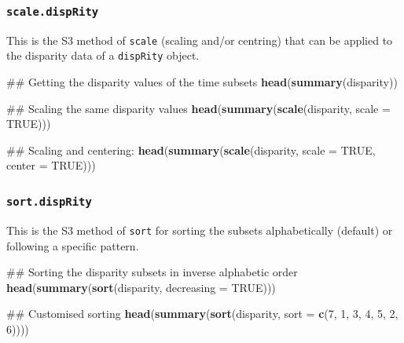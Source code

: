 \documentclass[]{book}
\newenvironment{Shaded}{\begin{snugshade}}{\end{snugshade}}
\newcommand{\KeywordTok}[1]{\textcolor[rgb]{0.13,0.29,0.53}{\textbf{#1}}}
\newcommand{\DataTypeTok}[1]{\textcolor[rgb]{0.13,0.29,0.53}{#1}}
\newcommand{\DecValTok}[1]{\textcolor[rgb]{0.00,0.00,0.81}{#1}}
\newcommand{\OtherTok}[1]{\textcolor[rgb]{0.56,0.35,0.01}{#1}}
\newcommand{\NormalTok}[1]{#1}
\theoremstyle{definition}
\theoremstyle{definition}
\theoremstyle{remark}
\begin{document}
\subsubsection{\texorpdfstring{\texttt{scale.dispRity}}{scale.dispRity}}\label{scale.disprity}

This is the S3 method of \texttt{scale} (scaling and/or centring) that
can be applied to the disparity data of a \texttt{dispRity} object.

\begin{Shaded}
\begin{Highlighting}[]
\NormalTok{## Getting the disparity values of the time subsets}
\KeywordTok{head}\NormalTok{(}\KeywordTok{summary}\NormalTok{(disparity))}

\NormalTok{## Scaling the same disparity values}
\KeywordTok{head}\NormalTok{(}\KeywordTok{summary}\NormalTok{(}\KeywordTok{scale}\NormalTok{(disparity, }\DataTypeTok{scale =} \OtherTok{TRUE}\NormalTok{)))}

\NormalTok{## Scaling and centering:}
\KeywordTok{head}\NormalTok{(}\KeywordTok{summary}\NormalTok{(}\KeywordTok{scale}\NormalTok{(disparity, }\DataTypeTok{scale =} \OtherTok{TRUE}\NormalTok{, }\DataTypeTok{center =} \OtherTok{TRUE}\NormalTok{)))}
\end{Highlighting}
\end{Shaded}

\subsubsection{\texorpdfstring{\texttt{sort.dispRity}}{sort.dispRity}}\label{sort.disprity}

This is the S3 method of \texttt{sort} for sorting the subsets
alphabetically (default) or following a specific pattern.

\begin{Shaded}
\begin{Highlighting}[]
\NormalTok{## Sorting the disparity subsets in inverse alphabetic order}
\KeywordTok{head}\NormalTok{(}\KeywordTok{summary}\NormalTok{(}\KeywordTok{sort}\NormalTok{(disparity, }\DataTypeTok{decreasing =} \OtherTok{TRUE}\NormalTok{)))}

\NormalTok{## Customised sorting}
\KeywordTok{head}\NormalTok{(}\KeywordTok{summary}\NormalTok{(}\KeywordTok{sort}\NormalTok{(disparity, }\DataTypeTok{sort =} \KeywordTok{c}\NormalTok{(}\DecValTok{7}\NormalTok{, }\DecValTok{1}\NormalTok{, }\DecValTok{3}\NormalTok{, }\DecValTok{4}\NormalTok{, }\DecValTok{5}\NormalTok{, }\DecValTok{2}\NormalTok{, }\DecValTok{6}\NormalTok{))))}
\end{Highlighting}
\end{Shaded}
\end{document}
